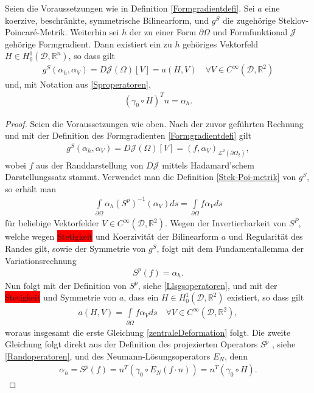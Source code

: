 \begin{theorem}
Seien die Voraussetzungen wie in Definition \ref{Formgradientdefi}. Sei $a$ eine koerzive, beschränkte, symmetrische Bilinearform, und $g^S$ die zugehörige Steklov-Poincaré-Metrik. Weiterhin sei $h$ der zu einer Form $\partial\Omega$ und Formfunktional $\mathcal{J}$ gehörige Formgradient. Dann existiert ein zu $h$ gehöriges Vektorfeld $H \in H^1_0(\mathcal{D}, \mathbb{R}^n)$, so dass gilt
\begin{equation}
\label{zentraleDeformation}
\begin{aligned}
	g^S(\alpha_h, \alpha_V) = D\mathcal{J}(\Omega)[V] = a(H,V) \quad \forall  V \in C^\infty(\mathcal{D},\mathbb{R}^2)
\end{aligned}
\end{equation}
und, mit Notation aus \ref{Sproperatoren},
\begin{align*}
	(\gamma_0\circ H)^T n = \alpha_h.
\end{align*}
\end{theorem}

\begin{proof}
Seien die Voraussetzungen wie oben. Nach der zuvor geführten Rechnung und mit der Definition des Formgradienten \ref{Formgradientdefi} gilt
\begin{align*}
	g^S(\alpha_h, \alpha_V) = D\mathcal{J}(\Omega)[V] = (f,\alpha_V)_{\mathcal{L}^2(\partial\Omega_2)},
\end{align*}
wobei $f$ aus der Randdarstellung von $D\mathcal{J}$ mittels Hadamard'schem Darstellungssatz stammt. Verwendet man die Definition \ref{Stek-Poi-metrik} von $g^S$, so erhält man
\begin{align*}
	\underset{\partial\Omega}{\int} \alpha_h (S^p)^{-1}(\alpha_V)ds = 				\underset{\partial\Omega}{\int} f \alpha_V ds
\end{align*}
für beliebige Vektorfelder $V\in C^\infty(\mathcal{D}, \mathbb{R}^2)$. Wegen der Invertierbarkeit von $S^P$, welche wegen \colorbox{red}{Stetigkeit} und Koerzivität der Bilinearform $a$ und Regularität des Randes gilt, sowie der Symmetrie von $g^S$, folgt mit dem Fundamentallemma der Variationsrechnung
\begin{align*}
	S^p(f) = \alpha_h.
\end{align*}
Nun folgt mit der Definition von $S^p$, siehe \ref{Llsgsoperatoren}, und mit der \colorbox{red}{Stetigkeit} und Symmetrie von $a$, dass ein $H \in H^1_0(\mathcal{D},\mathbb{R}^2)$ existiert, so dass gilt
\begin{align*}
	a(H,V) = \underset{\partial\Omega}{\int} f \alpha_V ds \quad \forall V\in C^\infty(\mathcal{D},\mathbb{R}^2),
\end{align*}
woraus insgesamt die erste Gleichung \ref{zentraleDeformation} folgt. Die zweite Gleichung folgt direkt aus der Definition des projezierten Operators $S^p$ , siehe \ref{Randoperatoren}, und des Neumann-Lösungsoperators $E_N$, denn
\begin{align*}
	\alpha_h = S^p(f) = n^T(\gamma_0\circ E_N(f\cdot n)) = n^T(\gamma_0 \circ H).
\end{align*}
\end{proof}

